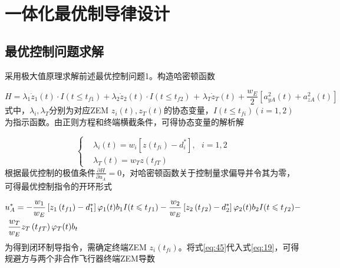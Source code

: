 \section{一体化最优制导律设计}
\subsection{最优控制问题求解}
采用极大值原理求解前述最优控制问题1。构造哈密顿函数

\begin{equation}
\label{eq:43}
H = {\lambda _1}{\dot z_1}(t) \cdot I(t \leqslant {t_{f1}}) + {\lambda _2}{\dot z_2}(t) \cdot I(t \leqslant {t_{f2}}){\text{ + }}{\lambda _T}{\dot z_T}(t) + \frac{{{w_E}}}{2}\left[ {a_{yA}^2(t) + a_{zA}^2(t)} \right]
\end{equation}
式中，${\lambda _i},{\lambda _T}$分别为对应ZEM ${z_i}(t),{z_T}(t)$的协态变量，$I(t \leqslant {t_{fi}})(i = 1,2)$为指示函数。由正则方程和终端横截条件，可得协态变量的解析解

\begin{equation}
\label{eq:44}
\left\{
\begin{aligned}
& {\lambda _i}\left( t \right) = {w_i}\left[ {z\left( {{t_{fi}}} \right) - d_i^*} \right],{\text{ }}i = 1,2 \\
& {\lambda _T}\left( t \right) = {w_T}z\left( {{t_{fT}}} \right)
\end{aligned}
\right.
\end{equation}
根据最优控制的极值条件$\frac{{\partial H}}{{\partial {u_A}}} = 0$，对哈密顿函数关于控制量求偏导并令其为零，可得最优控制指令的开环形式

\begin{equation}
\label{eq:45}
\begin{gathered}
  u_A^* =  - \frac{{{w_1}}}{{{w_E}}}\left[ {{z_1}\left( {{t_{f1}}} \right) - d_1^*} \right]{\varphi _1}(t){b_1}I(t \leqslant {t_{f1}}) - \frac{{{w_2}}}{{{w_E}}}\left[ {{z_2}\left( {{t_{f2}}} \right) - d_2^*} \right]{\varphi _2}(t){b_2}I(t \leqslant {t_{f2}}) -  \hfill \\
  {\text{    }}\frac{{{w_T}}}{{{w_E}}}{z_T}\left( {{t_{fT}}} \right){\varphi _T}(t){b_t} \hfill \\ 
\end{gathered}
\end{equation}
为得到闭环制导指令，需确定终端ZEM ${z_i}({t_{fi}})$。将式\eqref{eq:45}代入式\eqref{eq:19}，可得规避方与两个非合作飞行器终端ZEM导数

